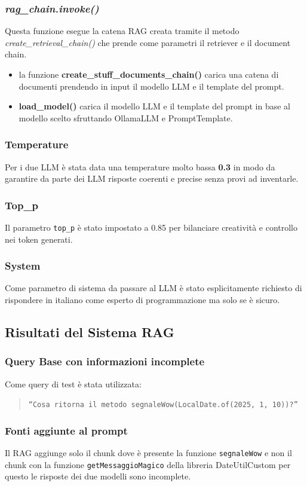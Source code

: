 \documentclass[12pt,a4paper,openright,twoside]{book}
\begin{document}
\subsubsection{\emph{rag\_chain.invoke()}}
 Questa funzione esegue la catena RAG creata tramite il metodo \emph{create\_retrieval\_chain()} che prende come parametri il retriever e il document chain.
 \begin{itemize}
    \item la funzione \textbf{create\_stuff\_documents\_chain()} carica una catena di documenti prendendo in input il modello LLM e il template del prompt.
    \item \textbf{load\_model()} carica il modello LLM e il template del prompt in base al modello scelto sfruttando OllamaLLM e PromptTemplate.
 \end{itemize}
 \subsubsection{Temperature}
Per i due LLM è stata data una temperature molto bassa \textbf{0.3} in modo da garantire da parte dei LLM risposte coerenti e precise senza provi ad inventarle.
\subsubsection{Top\_p}
Il parametro \texttt{top\_p} è stato impostato a 0.85 per bilanciare creatività e controllo nei token generati.
\subsubsection{System}
Come parametro di sistema da passare al LLM è stato esplicitamente richiesto di rispondere in italiano come esperto di programmazione ma solo se è sicuro.

\subsection{Risultati del Sistema RAG}
\subsubsection{Query Base con informazioni incomplete}
Come query di test è stata utilizzata:
\begin{quote}
    \texttt{``Cosa ritorna il metodo segnaleWow(LocalDate.of(2025, 1, 10))?''}
\end{quote}
\subsubsection{Fonti aggiunte al prompt}
Il RAG aggiunge solo il chunk dove è presente la funzione \texttt{segnaleWow} e non il chunk con la funzione \texttt{getMessaggioMagico} della libreria DateUtilCustom
per questo le risposte dei due modelli sono incomplete.
\end{document}
